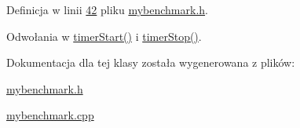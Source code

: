 Definicja w linii \hyperlink{mybenchmark_8h_source_l00042}{42} pliku \hyperlink{mybenchmark_8h_source}{mybenchmark.\-h}.



Odwołania w \hyperlink{mybenchmark_8cpp_source_l00012}{timer\-Start()} i \hyperlink{mybenchmark_8cpp_source_l00017}{timer\-Stop()}.



Dokumentacja dla tej klasy została wygenerowana z plików\-:\begin{DoxyCompactItemize}
\item 
\hyperlink{mybenchmark_8h}{mybenchmark.\-h}\item 
\hyperlink{mybenchmark_8cpp}{mybenchmark.\-cpp}\end{DoxyCompactItemize}

